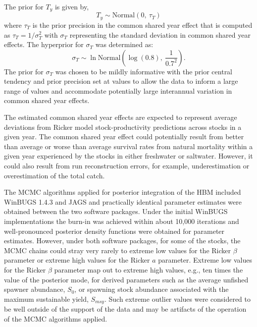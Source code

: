 \documentclass[french,11pt]{book}
\begin{document}
The prior for \(T_y\) is given by,
\begin{equation}
  T_y \sim \textrm{Normal}\left(0,\ \tau_T\right)
\end{equation}
where \(\tau_T\) is the prior precision in the common shared year effect that is computed as \(\tau_T=1/\sigma_T^2\) with \(\sigma_T\) representing the standard deviation in common shared year effects. The hyperprior for \(\sigma_T\) was determined as:
\begin{equation}
  \sigma_T \sim \ln \textrm{Normal} \left(\log{\left(0.8\right),\ \frac{1}{{0.7}^2}}\right).
\end{equation}
The prior for \(\sigma_T\) was chosen to be mildly informative with the prior central tendency and prior precision set at values to allow the data to inform a large range of values and accommodate potentially large interannual variation in common shared year effects.

The estimated common shared year effects are expected to represent average deviations from Ricker model stock-productivity predictions across stocks in a given year. The common shared year effect could potentially result from better than average or worse than average survival rates from natural mortality within a given year experienced by the stocks in either freshwater or saltwater. However, it could also result from run reconstruction errors, for example, underestimation or overestimation of the total catch.

\label{model-fitting}

The MCMC algorithms applied for posterior integration of the HBM included WinBUGS 1.4.3 and JAGS and practically identical parameter estimates were obtained between the two software packages. Under the initial WinBUGS implementations the burn-in was achieved within about 10,000 iterations and well-pronounced posterior density functions were obtained for parameter estimates. However, under both software packages, for some of the stocks, the MCMC chains could stray very rarely to extreme low values for the Ricker \(\beta\) parameter or extreme high values for the Ricker \(a\) parameter. Extreme low values for the Ricker \(\beta\) parameter map out to extreme high values, e.g., ten times the value of the posterior mode, for derived parameters such as the average unfished spawner abundance, \(S_0\), or spawning stock abundance associated with the maximum sustainable yield, \(S_{msy}\). Such extreme outlier values were considered to be well outside of the support of the data and may be artifacts of the operation of the MCMC algorithms applied.
\end{document}
